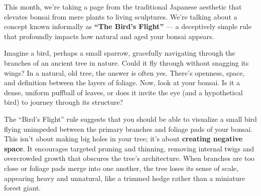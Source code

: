 	
	

\closearticle

\label{2025-12-gossip}
\noindent
This month, we're taking a page from the traditional Japanese aesthetic that elevates bonsai from mere plants to living sculptures.
We're talking about a concept known informally as \textbf{``The Bird's Flight''} --- a deceptively simple rule that profoundly impacts how natural and aged your bonsai appears.

Imagine a bird, perhaps a small sparrow, gracefully navigating through the branches of an ancient tree in nature.
Could it fly through without snagging its wings?
In a natural, old tree, the answer is often yes.
There's openness, space, and definition between the layers of foliage.
Now, look at your bonsai.
Is it a dense, uniform puffball of leaves, or does it invite the eye (and a hypothetical bird) to journey through its structure?

The ``Bird's Flight'' rule suggests that you should be able to visualize a small bird flying unimpeded between the primary branches and foliage pads of your bonsai.
This isn't about making big holes in your tree; it's about \textbf{creating negative space}.
It encourages targeted pruning and thinning, removing internal twigs and overcrowded growth that obscures the tree's architecture.
When branches are too close or foliage pads merge into one another, the tree loses its sense of scale, appearing heavy and unnatural, like a trimmed hedge rather than a miniature forest giant.

